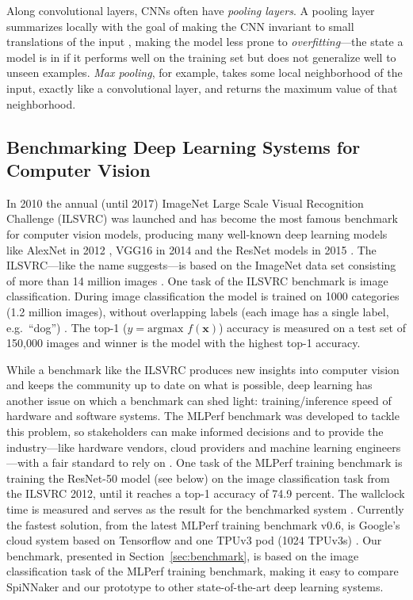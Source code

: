 \documentclass[]{article}
\begin{document}
Along convolutional layers, CNNs often have \textit{pooling layers}.
A pooling layer summarizes locally with the goal of making the
CNN invariant to small translations of the input
\citep{goodfellow_et_al_2016}, making the model less prone to
\textit{overfitting}---the state a model is in if it performs well
on the training set but does not generalize well to unseen examples.
\textit{Max pooling}, for example, takes some local neighborhood of
the input, exactly like a convolutional layer, and returns the
maximum value of that neighborhood.



\subsection{Benchmarking Deep Learning Systems for Computer Vision} %
\label{subsec:intro_bench}

In 2010 the annual (until 2017) ImageNet Large Scale Visual
Recognition Challenge (ILSVRC) was launched and has become the most
famous benchmark for computer vision models, producing many well-known
deep learning models like AlexNet in 2012
\citep{krizhevsky_et_al_2012}, VGG16 in 2014
\citep{simonyan_et_al_2014} and the ResNet models in 2015
\citep{he_et_al_2015}.
The ILSVRC---like the name suggests---is based on the ImageNet data
set consisting of more than 14 million images
\citep{russakovsky_et_al_2015}.
One task of the ILSVRC benchmark is image classification.
During image classification the model is trained on 1000 categories
(1.2 million images), without overlapping labels (each image has a
single label, e.g.~``dog'') \citep{russakovsky_et_al_2015}.
The top-1 ($y = \text{argmax } f(\mathbf{x})$) accuracy is measured on
a test set of 150,000 images and winner is the model with the highest
top-1 accuracy.

While a benchmark like the ILSVRC produces new insights into computer
vision and keeps the community up to date on what is possible,
deep learning has another issue on which a benchmark can shed light:
training/inference speed of hardware and software systems.
The MLPerf benchmark was developed to tackle this problem, so
stakeholders can make informed decisions and to provide the
industry---like hardware vendors, cloud providers and machine learning
engineers---with a fair standard to rely on
\citep{mattson_et_al_2019}.
One task of the MLPerf training benchmark is training the ResNet-50
model (see below) on the image classification task from the ILSVRC
2012, until it reaches a top-1 accuracy of 74.9 percent.
The wallclock time is measured and serves as the result for the
benchmarked system \citep{mattson_et_al_2019}.
Currently the fastest solution, from the latest MLPerf training
benchmark v0.6, is Google's cloud system based on Tensorflow and
one TPUv3 pod (1024 TPUv3s) \citep{mlperf_2019, stone_2019}.
Our benchmark, presented in Section~\ref{sec:benchmark}, is based
on the image classification task of the MLPerf training benchmark,
making it easy to compare SpiNNaker and our prototype to other
state-of-the-art deep learning systems.
\end{document}
